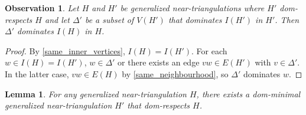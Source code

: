 \documentclass[a4paper,UKenglish,cleveref, autoref, thm-restate]{lipics-v2021}
\newtheorem{obs}{Observation}
\newtheorem{lem}{Lemma}
\begin{document}
\begin{obs}
  Let $H$ and $H'$ be generalized near-triangulations where $H'$ dom-respects $H$ and let $\Delta'$ be a subset of $V(H')$ that dominates $I(H')$ in $H'$.  Then $\Delta'$ dominates $I(H)$ in $H$.
\end{obs}

\begin{proof}
  By \cref{same_inner_vertices}, $I(H)=I(H')$. For each $w\in I(H)=I(H')$, $w\in \Delta'$ or there exists an edge $vw\in E(H')$ with $v\in\Delta'$.  In the latter case, $vw\in E(H)$ by \cref{same_neighbourhood}, so $\Delta'$ dominates $w$.
\end{proof}

\begin{lem}\label{dom_minimal}
  For any generalized near-triangulation $H$, there exists a dom-minimal generalized near-triangulation $H'$ that dom-respects $H$.
\end{lem}
\end{document}
